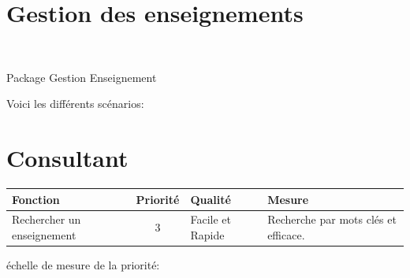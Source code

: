 \section{Gestion des enseignements}

\begin{center}
\\
\par{Package Gestion Enseignement}
\end{center}

Voici les diff{\'e}rents sc{\'e}narios:\\

\section*{Consultant}

\begin{tabular}{|p{4cm}|c|p{4cm}|p{5cm}|}
\hline
  Fonction & Priorit{\'e} & Qualit{\'e} & Mesure \\
\hline
Rechercher un enseignement & 3 & Facile et Rapide & Recherche par mots
  cl{\'e}s et efficace.\\
\hline
\end{tabular}

\begin{center}
{\'e}chelle de mesure de la priorit{\'e}:

\end{center}

